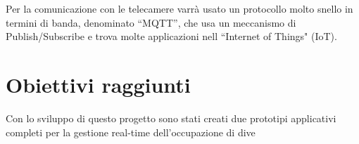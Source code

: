 Per la comunicazione con le telecamere varrà usato un protocollo molto snello in termini di banda, denominato ``MQTT'', che usa un meccanismo di Publish/Subscribe e trova molte applicazioni nell ``Internet of Things" (IoT).

\section{Obiettivi raggiunti}
Con lo sviluppo di questo progetto sono stati creati due prototipi applicativi completi per la gestione real-time dell'occupazione di dive


